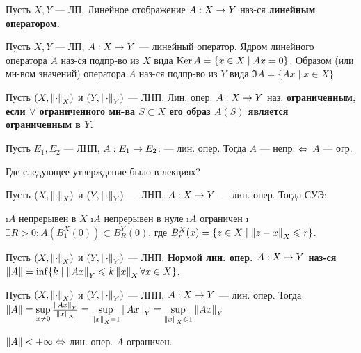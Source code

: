 \begin{defn}
Пусть $X, Y$ --- ЛП. Линейное отображение $A: X \rightarrow Y$ наз-ся \bf{линейным оператором}.
\end{defn}

\begin{defn}
Пусть $X, Y$ --- ЛП, $A: X \rightarrow Y$ --- линейный оператор. Ядром линейного оператора $A$ наз-ся подпр-во из $X$ вида $\operatorname{Ker} A = \{x \in X \mid Ax = 0\}$. Образом (или мн-вом значений) оператора $A$ наз-ся подпр-во из $Y$ вида $\Im A = \{Ax \mid x \in X\}$
\end{defn}

\begin{defn}
Пусть $(X, \left\lVert\cdot\right\rVert_X)$ и $(Y, \left\lVert\cdot\right\rVert_Y)$ --- ЛНП. Лин. опер. $A: X \rightarrow Y$ наз. \bf{ограниченным}, если $\forall$ ограниченного мн-ва $S \subset X$ его образ $A(S)$ является ограниченным в $Y$. 
\end{defn}

\begin{thm}[5.1]
Пусть $E_1, E_2$ --- ЛНП, $A: E_1 \rightarrow E_2$: --- лин. опер. Тогда $A$ --- непр. $\Leftrightarrow$ $A$ --- огр.
\end{thm}

Где следующее утверждение было в лекциях?
\begin{stmt}
Пусть $(X, \left\lVert\cdot\right\rVert_X)$ и $(Y, \left\lVert\cdot\right\rVert_Y)$ --- ЛНП, $A: X \rightarrow Y$ --- лин. опер. Тогда СУЭ:
\begin{enumerate}
\i $A$ непрерывен в $X$
\i $A$ непрерывен в нуле
\i $A$ ограничен
\i $\exists R > 0: A(B_1^X(0)) \subset B_R^Y(0)$, где $B_r^X (x) = \{z \in X \mid \left\lVert z-x\right\rVert_X \leqslant r\}$.
\end{enumerate}
\end{stmt}

\begin{defn}
Пусть $(X, \left\lVert\cdot\right\rVert_X)$ и $(Y, \left\lVert\cdot\right\rVert_Y)$ --- ЛНП. \bf{Нормой} лин. опер. $A: X \rightarrow Y$ наз-ся $\left\lVert A\right\rVert = \inf\{k \mid \left\lVert Ax\right\rVert_Y \leqslant k\left\lVert x\right\rVert_X \forall x \in X \}$.
\end{defn}

\begin{stmt}
Пусть $(X, \left\lVert\cdot\right\rVert_X)$ и $(Y, \left\lVert\cdot\right\rVert_Y)$ --- ЛНП, $A: X \rightarrow Y$ --- лин. опер. Тогда 
$\left\lVert A\right\rVert 
= \sup\limits_{x \ne 0} \frac{\left\lVert Ax\right\rVert_Y}{\left\lVert x\right\rVert_X} 
= \sup\limits_{\left\lVert x\right\rVert_X = 1} \left\lVert Ax\right\rVert_Y 
= \sup\limits_{\left\lVert x\right\rVert_X \leqslant 1} \left\lVert Ax\right\rVert_Y$
\end{stmt}

\begin{stmt}
$\left\lVert A\right\rVert < +\infty \Leftrightarrow $ лин. опер. $A$ ограничен.
\end{stmt}

